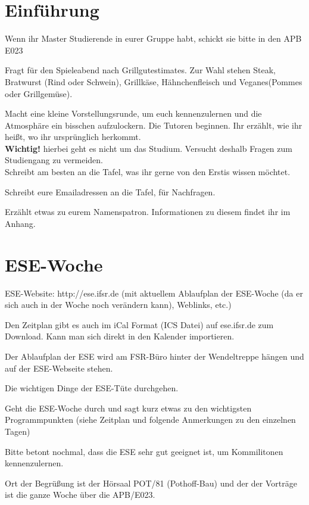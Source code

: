 \documentclass[a4paper,12pt]{report}
\begin{document}
\section{Einführung}
\begin{itemize*}
\item Wenn ihr Master Studierende in eurer Gruppe habt, schickt sie bitte in den APB E023
\item Fragt für den Spieleabend nach Grillgutestimates. Zur Wahl stehen Steak, Bratwurst (Rind oder Schwein), Grillkäse, Hähnchenfleisch und Veganes(Pommes oder Grillgemüse).
\item Macht eine kleine Vorstellungsrunde, um euch kennenzulernen und die Atmosphäre ein bisschen aufzulockern.
Die Tutoren beginnen. Ihr erzählt, wie ihr heißt, wo ihr ursprünglich herkommt.\\
\textbf{Wichtig!} hierbei geht es nicht um das Studium. Versucht deshalb Fragen zum Studiengang zu vermeiden.\\
Schreibt am besten an die Tafel, was ihr gerne von den Erstis wissen möchtet.
\item Schreibt eure Emailadressen an die Tafel, für Nachfragen.
\item Erzählt etwas zu eurem Namenspatron. Informationen zu diesem findet ihr im Anhang.
\end{itemize*}

\section{ESE-Woche}
\begin{itemize*}
\item ESE-Website: http://ese.ifsr.de (mit aktuellem Ablaufplan der ESE-Woche (da er sich auch in der Woche noch verändern kann), Weblinks, etc.)
\item Den Zeitplan gibt es auch im iCal Format (ICS Datei) auf ese.ifsr.de zum Download.
Kann man sich direkt in den Kalender importieren.
\item Der Ablaufplan der ESE wird am FSR-Büro hinter der Wendeltreppe hängen und auf der ESE-Webseite stehen.
\item Die wichtigen Dinge der ESE-Tüte durchgehen.
\item Geht die ESE-Woche durch und sagt kurz etwas zu den wichtigsten Programmpunkten (siehe Zeitplan und folgende Anmerkungen zu den einzelnen Tagen)
\item Bitte betont nochmal, dass die ESE sehr gut geeignet ist, um Kommilitonen kennenzulernen.
\end{itemize*}
Ort der Begrüßung ist der Hörsaal POT/81 (Pothoff-Bau) und der der Vorträge ist die ganze Woche über die APB/E023.
\end{document}
